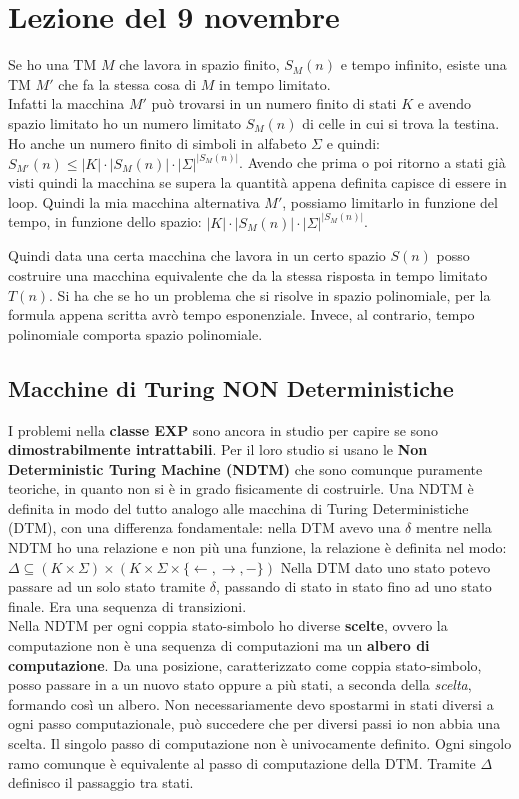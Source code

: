 \section{Lezione del 9 novembre}
Se ho una TM $M$ che lavora in spazio finito, $S_M(n)$ e tempo infinito, esiste una TM $M'$ che fa la stessa cosa di $M$ in tempo limitato.\\
Infatti la macchina $M'$ può trovarsi in un numero finito di stati $K$ e avendo spazio limitato ho un numero limitato $S_M(n)$ di celle in cui si trova la testina. Ho anche un numero finito di simboli in alfabeto $\Sigma$ e quindi: $S_{M'}(n)\leq|K|\cdot |S_M(n)|\cdot |\Sigma|^{|S_M(n)|}$. Avendo che prima o poi ritorno a stati già visti quindi la macchina se supera la quantità appena definita capisce di essere in loop. Quindi la mia macchina alternativa $M'$, possiamo limitarlo in funzione del tempo, in funzione dello spazio: $|K|\cdot |S_M(n)|\cdot |\Sigma|^{|S_M(n)|}$.

Quindi data una certa macchina che lavora in un certo spazio $S(n)$ posso costruire una macchina equivalente che da la stessa risposta in tempo limitato $T(n)$. Si ha che se ho un problema che si risolve in spazio polinomiale, per la formula appena scritta avrò tempo esponenziale. Invece, al contrario, tempo polinomiale comporta spazio polinomiale.

\subsection{Macchine di Turing NON Deterministiche}
I problemi nella \textbf{classe EXP} sono ancora in studio per capire se sono \textbf{dimostrabilmente intrattabili}. Per il loro studio si usano le \textbf{Non Deterministic Turing Machine (NDTM)} che sono comunque puramente teoriche, in quanto non si è in grado fisicamente di costruirle. Una NDTM è definita in modo del tutto analogo alle macchina di Turing Deterministiche (DTM), con una differenza fondamentale: nella DTM avevo una $\delta$ mentre nella NDTM ho una relazione e non più una funzione, la relazione è definita nel modo: $\Delta\subseteq (K\times \Sigma)\times (K\times \Sigma \times\{\leftarrow, \rightarrow, -\})$ 
Nella DTM dato uno stato potevo passare ad un solo stato tramite $\delta$, passando di stato in stato fino ad uno stato finale. Era una sequenza di transizioni. \\
Nella NDTM per ogni coppia stato-simbolo ho diverse \textbf{scelte}, ovvero la computazione non è una sequenza di computazioni ma un \textbf{albero di computazione}. Da una posizione, caratterizzato come coppia stato-simbolo, posso passare in a un nuovo stato oppure a più stati, a seconda della \textit{scelta}, formando così un albero. Non necessariamente devo spostarmi in stati diversi a ogni passo computazionale, può succedere che per diversi passi io non abbia una scelta. Il singolo passo di computazione non è univocamente definito. Ogni singolo ramo comunque è equivalente al passo di computazione della DTM. Tramite $\Delta$ definisco il passaggio tra stati.\\


